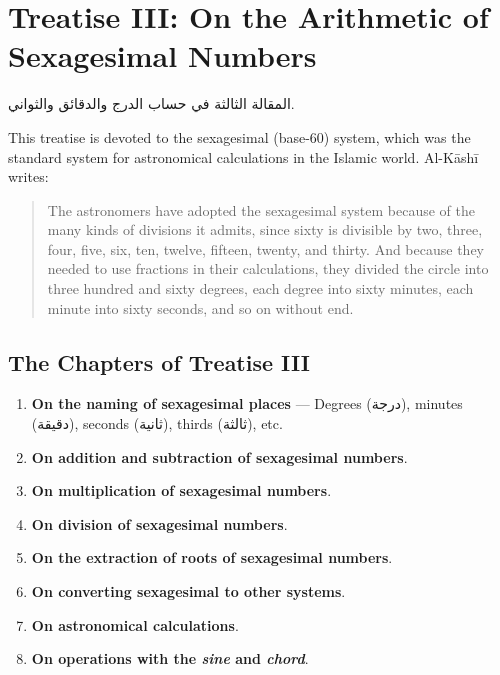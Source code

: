 \documentclass[11pt,a4paper]{article}
\newenvironment{arabicbox}{%
  \begin{framed}
  \begin{minipage}{\linewidth-2\fboxsep-2\fboxrule}
  \setlength{\parindent}{0pt}
  \linespread{1.3}\selectfont
}{%
  \end{minipage}
  \end{framed}
}
\newcommand{\ar}[1]{{\arabicfont\beginR #1\endR}}
\begin{document}
\section{Treatise III: On the Arithmetic of Sexagesimal Numbers}
\label{sec:treatise3}

\begin{arabicbox}
\begin{Arabic}
المقالة الثالثة في حساب الدرج والدقائق والثواني.
\end{Arabic}
\end{arabicbox}

\vspace{0.3cm}

\noindent This treatise is devoted to the sexagesimal (base-60) system,
which was the standard system for astronomical calculations in the
Islamic world. Al-K\=ash\=i writes:

\begin{quote}
The astronomers have adopted the sexagesimal system because of the many
kinds of divisions it admits, since sixty is divisible by two, three,
four, five, six, ten, twelve, fifteen, twenty, and thirty. And because
they needed to use fractions in their calculations, they divided the
circle into three hundred and sixty degrees, each degree into sixty
minutes, each minute into sixty seconds, and so on without end.
\end{quote}

\subsection{The Chapters of Treatise III}

\begin{enumerate}[label=\textbf{Ch.\arabic*:}]
  \item \textbf{On the naming of sexagesimal places} --- Degrees
  (\ar{درجة}), minutes (\ar{دقيقة}), seconds (\ar{ثانية}), thirds
  (\ar{ثالثة}), etc.
  \item \textbf{On addition and subtraction of sexagesimal numbers}.
  \item \textbf{On multiplication of sexagesimal numbers}.
  \item \textbf{On division of sexagesimal numbers}.
  \item \textbf{On the extraction of roots of sexagesimal numbers}.
  \item \textbf{On converting sexagesimal to other systems}.
  \item \textbf{On astronomical calculations}.
  \item \textbf{On operations with the \textit{sine} and
  \textit{chord}}.
\end{enumerate}
\end{document}
